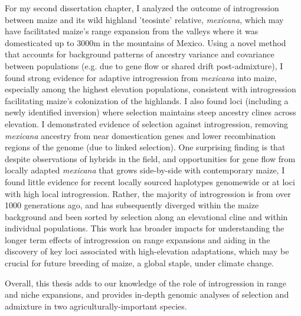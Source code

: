 	For my second dissertation chapter, I analyzed the outcome of introgression between maize and its wild highland 'teosinte' relative, \textit{mexicana},
	which may have facilitated maize’s range expansion from the valleys where it was domesticated up to 3000m in the mountains of Mexico.
	Using a novel method that accounts for background patterns of ancestry variance and covariance between populations
	(e.g. due to gene flow or shared drift post-admixture), I found strong evidence for adaptive introgression from \textit{mexicana} into maize,
	especially among the highest elevation populations, consistent with introgression facilitating maize’s colonization of the highlands.
	I also found loci (including a newly identified inversion) where selection maintains steep ancestry clines across elevation.
	I demonstrated evidence of selection against introgression,
	removing \textit{mexicana} ancestry from near domestication genes and lower recombination regions of the genome (due to linked selection).
	One surprising finding is that despite observations of hybrids in the field,
	and opportunities for gene flow from locally adapted \textit{mexicana} that grows side-by-side with contemporary maize,
	I found little evidence for recent locally sourced haplotypes genomewide or at loci with high local introgression.
	Rather, the majority of introgression is from over 1000 generations ago,
	and has subsequently diverged within the maize background and been sorted by selection along an elevational cline and within individual populations.
	This work has broader impacts for understanding the longer term effects of introgression on range expansions and aiding in the discovery of key loci associated with high-elevation adaptations,
	which may be crucial for future breeding of maize, a global staple, under climate change.
	
	Overall, this thesis adds to our knowledge of the role of introgression in range and niche expansions,
	and provides in-depth genomic analyses of selection and admixture in two agriculturally-important species.
